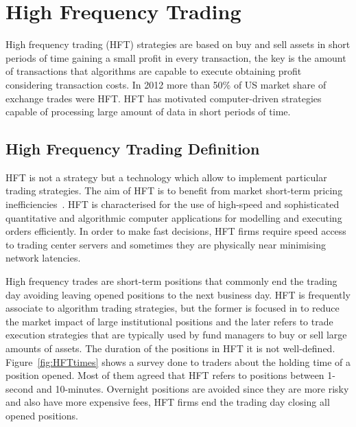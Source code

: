 \chapter{High Frequency Trading}

\vspace{0.5cm} 

High frequency trading (HFT) strategies are based on buy and sell assets in
short periods of time gaining a small profit in every transaction, the key is
the amount of transactions that algorithms are capable to execute obtaining profit considering transaction costs. 
In 2012 more than 50\% of US market share of exchange trades were HFT.  HFT has
motivated computer-driven strategies capable of processing large amount of data
in short periods of time. 


\section{High Frequency Trading Definition}

HFT is not a strategy but a technology which allow to implement particular
trading strategies. The aim of HFT is to benefit from market short-term pricing
inefficiencies~\cite{chlistalla2011}. HFT is characterised for the use of
high-speed and sophisticated quantitative and algorithmic computer applications
for modelling and executing orders efficiently. In order to make fast decisions,
HFT firms require speed access to trading center servers and sometimes they are
physically near minimising network latencies.

High frequency trades are short-term positions that commonly end the trading
day avoiding leaving opened positions to the next business day. HFT is
frequently associate to algorithm trading strategies, but the former is focused
in to reduce the market impact of large institutional positions and the later refers to trade execution strategies that are typically used by fund managers to buy or sell large amounts of assets. The duration of the positions in HFT it is not well-defined. Figure~\ref{fig:HFTtimes} shows a survey done to traders about the holding time
of a position opened. Most of them agreed that HFT refers to positions between
1-second and 10-minutes. Overnight positions are avoided since they are more
risky and also have more expensive fees, HFT firms end the trading day closing all
opened positions.

